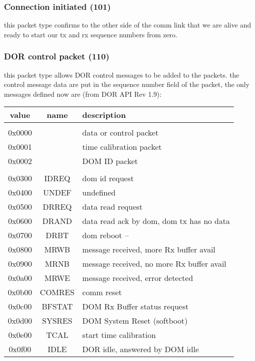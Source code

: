 \documentclass[11pt]{article}
\begin{document}
\hypertarget{connection-initiated}{\subsubsection{Connection initiated (101)}}
this packet type confirms to the
         other side of the comm link that we are alive and ready
         to start our tx and rx sequence numbers from zero.

\hypertarget{dor-control-packet}{\subsubsection{DOR control packet (110)}}
this packet type allows DOR control
         messages to be added to the packets.  the control message
         data are put in the sequence number field of the packet, the
         only messages defined now are (from DOR API Rev 1.9):

\begin{tabular}[]{ccl}
	value & name & description \\ \hline \\
	0x0000 & & data or control packet \\
	0x0001 & & time calibration packet \\
	0x0002 & & DOM ID packet \\ \hline \\
        0x0300 & IDREQ  & dom id request \\
        0x0400 & UNDEF  & undefined \\
        0x0500 & DRREQ  & data read request \\
        0x0600 & DRAND  & data read ack by dom, dom tx has no data \\
        0x0700 & DRBT   & dom reboot --  \\
        0x0800 & MRWB   & message received, more Rx buffer avail \\
        0x0900 & MRNB   & message received, no more Rx buffer avail \\
        0x0a00 & MRWE   & message received, error detected \\
        0x0b00 & COMRES & comm reset \\
        0x0c00 & BFSTAT & DOM Rx Buffer status request \\
        0x0d00 & SYSRES & DOM System Reset (softboot) \\
        0x0e00 & TCAL   & start time calibration \\
        0x0f00 & IDLE   & DOR idle, answered by DOM idle \\
\end{tabular}
\end{document}
